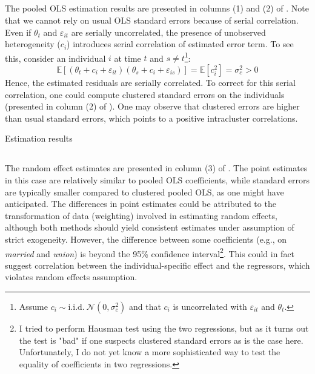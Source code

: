 \documentclass[]{article}
\begin{document}
\subsection{}
The pooled OLS estimation results are presented in columns (1) and (2) of . Note that we cannot rely on usual OLS standard errors because of serial correlation. Even if $\theta_t$ and $\varepsilon_{it}$ are serially uncorrelated, the presence of unobserved heterogeneity ($c_i$) introduces serial correlation of estimated error term. To see this, consider an individual $i$ at time $t$ and $s\neq t$\footnote{Assume $c_i\sim\text{i.i.d.}~\mathcal{N}(0, \sigma_c^2)$ and that $c_i$ is uncorrelated with $\varepsilon_{it}$ and $\theta_t$.}:
\begin{equation}
	\mathbb{E}\left[(\theta_t + c_i + \varepsilon_{it})(\theta_s + c_i + \varepsilon_{is})\right] = \mathbb{E}\left[c_i^2\right] = \sigma_c^2 > 0 \nonumber
\end{equation}
Hence, the estimated residuals are serially correlated. To correct for this serial correlation, one could compute clustered standard errors on the individuals (presented in column (2) of ). One may observe that clustered errors are higher than usual standard errors, which points to a positive intracluster correlations.

\begin{table}[]
	\centering
	
	\caption{Estimation results}
	\label{tab:ex2estres}
\end{table}

\subsection{}
The random effect estimates are presented in column (3) of . The point estimates in this case are relatively similar to pooled OLS coefficients, while standard errors are typically smaller compared to clustered pooled OLS, as one might have anticipated. The differences in point estimates could be attributed to the transformation of data (weighting) involved in estimating random effects, although both methods should yield consistent estimates under assumption of strict exogeneity. However, the difference between some coefficients (e.g., on \textit{married} and \textit{union}) is beyond the 95\% confidence interval\footnote{I tried to perform Hausman test using the two regressions, but as it turns out the test is "bad" if one suspects clustered standard errors as is the case here. Unfortunately, I do not yet know a more sophisticated way to test the equality of coefficients in two regressions.}. This could in fact suggest correlation between the individual-specific effect and the regressors, which violates random effects assumption.
\end{document}
